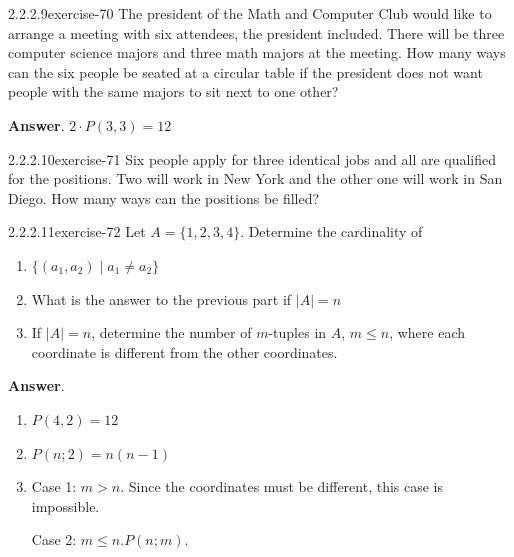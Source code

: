 \documentclass[twoside,10pt,]{book}
\numberwithin{equation}{section}
\begin{document}
\begin{divisionsolution}{2.2.2.9}{}{exercise-70}%
\hypertarget{p-688}{}%
The president of the Math and Computer Club would like to arrange a meeting with six attendees, the president included. There will be three computer science majors and three math majors at the meeting. How many ways can the six people be seated at a circular table if the president does not want people with the same majors to sit next to one other?%
\par\smallskip%
\noindent\textbf{Answer}.\quad%
\hypertarget{p-689}{}%
\(2\cdot P(3,3)=12\)%
\end{divisionsolution}%
\begin{divisionsolution}{2.2.2.10}{}{exercise-71}%
\hypertarget{p-690}{}%
Six people apply for three identical jobs and all are qualified for the positions. Two will work in New York and the other one will work in San Diego. How many ways can the positions be filled?%
\end{divisionsolution}%
\begin{divisionsolution}{2.2.2.11}{}{exercise-72}%
\hypertarget{p-691}{}%
Let \(A = \{1, 2, 3, 4\} \). Determine the cardinality of%
\par
\hypertarget{p-692}{}%
\leavevmode%
\begin{enumerate}[label=(\alph*)]
\item\hypertarget{li-433}{}\hypertarget{p-693}{}%
\(\{ (a_1,a_2) \mid a_1 \neq a_2 \}\)%
\item\hypertarget{li-434}{}\hypertarget{p-694}{}%
What is the answer to the previous part if \(\lvert A \rvert = n\)%
\item\hypertarget{li-435}{}\hypertarget{p-695}{}%
If \(\lvert A \rvert =n\), determine the number of \(m\)-tuples in \(A\), \(m \leq n\), where each coordinate is different from the other coordinates.%
\end{enumerate}
%
\par\smallskip%
\noindent\textbf{Answer}.\quad%
\hypertarget{p-696}{}%
\leavevmode%
\begin{enumerate}[label=(\alph*)]
\item\hypertarget{li-436}{}\(P(4,2)=12\)%
\item\hypertarget{li-437}{}\hypertarget{p-697}{}%
\(P(n;2)=n(n-1)\)%
\item\hypertarget{li-438}{}\hypertarget{p-698}{}%
Case 1: \(m>n\). Since the coordinates must be different, this case is impossible.%
\par
\hypertarget{p-699}{}%
Case 2: \(m\leqslant n. P(n;m)\).%
\end{enumerate}
%
\end{divisionsolution}%
\end{document}
